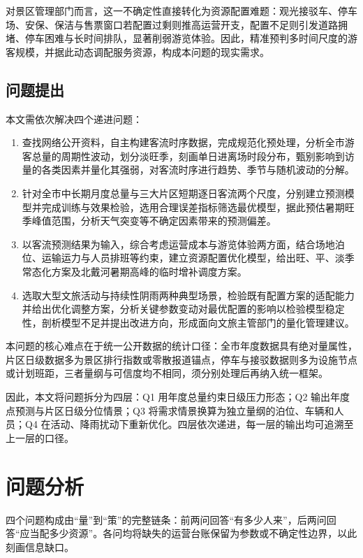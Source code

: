 \documentclass[withoutpreface,bwprint]{cumcmthesis}
\begin{document}
对景区管理部门而言，这一不确定性直接转化为资源配置难题：观光接驳车、停车场、安保、保洁与售票窗口若配置过剩则推高运营开支，配置不足则引发道路拥堵、停车困难与长时间排队，显著削弱游览体验。因此，精准预判多时间尺度的游客规模，并据此动态调配服务资源，构成本问题的现实需求。

\subsection{问题提出}
本文需依次解决四个递进问题：

\begin{enumerate}[label=（\arabic*）,leftmargin=2.2em]
\item 查找网络公开资料，自主构建客流时序数据，完成规范化预处理，分析全市游客总量的周期性波动，划分淡旺季，刻画单日进离场时段分布，甄别影响到访量的各类因素并量化其强弱，对客流时序进行趋势、季节与随机波动的分解。
\item 针对全市中长期月度总量与三大片区短期逐日客流两个尺度，分别建立预测模型并完成训练与效果检验，选用合理误差指标筛选最优模型，据此预估暑期旺季峰值范围，分析天气突变等不确定因素带来的预测偏差。
\item 以客流预测结果为输入，综合考虑运营成本与游览体验两方面，结合场地泊位、运输运力与人员排班等约束，建立资源配置优化模型，给出旺、平、淡季常态化方案及北戴河暑期高峰的临时增补调度方案。
\item 选取大型文旅活动与持续性阴雨两种典型场景，检验既有配置方案的适配能力并给出优化调整方案，分析关键参数变动对最优配置的影响以检验模型稳定性，剖析模型不足并提出改进方向，形成面向文旅主管部门的量化管理建议。
\end{enumerate}

本问题的核心难点在于统一公开数据的统计口径：全市年度数据具有绝对量属性，片区日级数据多为景区排行指数或零散报道锚点，停车与接驳数据则多为设施节点或计划班距，三者量纲与可信度均不相同，须分别处理后再纳入统一框架。

因此，本文将问题拆分为四层：Q1 用年度总量约束日级压力形态；Q2 输出年度点预测与片区日级分位情景；Q3 将需求情景换算为独立量纲的泊位、车辆和人员；Q4 在活动、降雨扰动下重新优化。四层依次递进，每一层的输出均可追溯至上一层的口径。

\section{问题分析}
四个问题构成由“量”到“策”的完整链条：前两问回答“有多少人来”，后两问回答“应当配多少资源”。各问均将缺失的运营台账保留为参数或不确定性边界，以此刻画信息缺口。
\end{document}
